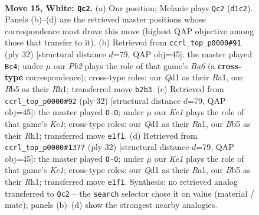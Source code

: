 \documentclass[11pt]{article}
\begin{document}
\clearpage

\begin{figure}[p]\centering
\begin{subfigure}{0.46\textwidth}\centering
\resizebox{\linewidth}{!}{%
\newchessgame
\chessboard[
  setfen={rnbq1k1r/4bp2/8/pB1p3p/3Pp2P/8/PP3PP1/R2QK1NR w KQ - 1 15},
  showmover=false,
  pgfstyle=straightmove, color=movearrow, markmove={d1-c2}
]}
\caption{}
\end{subfigure}\hfill
\begin{subfigure}{0.46\textwidth}\centering
\resizebox{\linewidth}{!}{%
\newchessgame
\chessboard[
  setfen={1r1q1rk1/3b1ppp/B2p4/3Np1b1/pP2P3/8/1P3PPP/R2QK2R w KQ - 1 17},
  showmover=false,
  pgfstyle=straightmove, color=movearrow, markmove={a6-c4}
]}
\caption{}
\end{subfigure}
\\[4pt]
\begin{subfigure}{0.46\textwidth}\centering
\resizebox{\linewidth}{!}{%
\newchessgame
\chessboard[
  setfen={1r1q1rk1/3b1ppp/B2p4/3Np1b1/pP2P3/8/1P3PPP/R2QK2R w KQ - 1 17},
  showmover=false,
  pgfstyle=straightmove, color=movearrow, markmove={e1-g1}
]}
\caption{}
\end{subfigure}\hfill
\begin{subfigure}{0.46\textwidth}\centering
\resizebox{\linewidth}{!}{%
\newchessgame
\chessboard[
  setfen={1r1q1rk1/3b1ppp/B2p4/3Np1b1/pP2P3/8/1P3PPP/R2QK2R w KQ - 1 17},
  showmover=false,
  pgfstyle=straightmove, color=movearrow, markmove={e1-g1}
]}
\caption{}
\end{subfigure}
\caption{\textbf{Move 15, White: \texttt{Qc2}.} (a) Our position; Melanie plays \texttt{Qc2} (\texttt{d1c2}). Panels (b)--(d) are the retrieved master positions whose correspondence most drove this move (highest QAP objective among those that transfer to it). (b) Retrieved from \texttt{ccrl\_top\_p0000\#91} (ply 32) [structural distance $d$=79, QAP obj=45]: the master played \texttt{Bc4}; under $\mu$ our \emph{Pb2} plays the role of that game's \emph{Ba6} (a \textbf{cross-type} correspondence); cross-type roles: our \emph{Q}d1 as their \emph{R}a1, our \emph{B}b5 as their \emph{R}h1; transferred move \texttt{b2b3}. (c) Retrieved from \texttt{ccrl\_top\_p0000\#92} (ply 32) [structural distance $d$=79, QAP obj=45]: the master played \texttt{O-O}; under $\mu$ our \emph{Ke1} plays the role of that game's \emph{Ke1}; cross-type roles: our \emph{Q}d1 as their \emph{R}a1, our \emph{B}b5 as their \emph{R}h1; transferred move \texttt{e1f1}. (d) Retrieved from \texttt{ccrl\_top\_p0000\#1377} (ply 32) [structural distance $d$=79, QAP obj=45]: the master played \texttt{O-O}; under $\mu$ our \emph{Ke1} plays the role of that game's \emph{Ke1}; cross-type roles: our \emph{Q}d1 as their \emph{R}a1, our \emph{B}b5 as their \emph{R}h1; transferred move \texttt{e1f1}. Synthesis: no retrieved analog transferred to \texttt{Qc2} -- the \texttt{search} selector chose it on value (material / mate); panels (b)--(d) show the strongest nearby analogies.}
\label{fig:thought-m28}
\end{figure}
\end{document}

